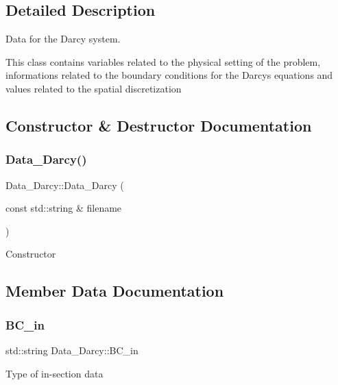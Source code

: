 \subsection{Detailed Description}
Data for the Darcy system. 

This class contains variables related to the physical setting of the problem, informations related to the boundary conditions for the Darcy\textquotesingle{}s equations and values related to the spatial discretization 

\subsection{Constructor \& Destructor Documentation}
\mbox{\label{classData__Darcy_a6941ffb73d1eb40f2d21e4a50f23567c}} 
\subsubsection{\texorpdfstring{Data\+\_\+\+Darcy()}{Data\_Darcy()}}
{\footnotesize\ttfamily Data\+\_\+\+Darcy\+::\+Data\+\_\+\+Darcy (\begin{DoxyParamCaption}\item[{const std\+::string \&}]{filename }\end{DoxyParamCaption})\hspace{0.3cm}{\ttfamily [explicit]}}

Constructor 

\subsection{Member Data Documentation}
\mbox{\label{classData__Darcy_ae3db5526192e3622b48979dfe8f89d09}} 
\subsubsection{\texorpdfstring{B\+C\+\_\+in}{BC\_in}}
{\footnotesize\ttfamily std\+::string Data\+\_\+\+Darcy\+::\+B\+C\+\_\+in}

Type of in-\/section data \mbox{\label{classData__Darcy_a3798aaae34aca37298c0b02d6e235a8a}} 
